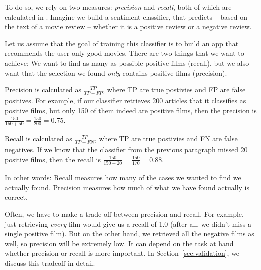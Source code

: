 
To do so, we rely on two measures: \emph{precision} and \emph{recall}, both of which are calculated in .
Imagine we build a sentiment classifier, that predicts -- based on the
text of a movie review -- whether it is a positive review or a
negative review.

Let us assume that the goal of training this classifier is to build an
app that recommends the user only good movies. There are two things
that we want to achieve: We want to find as many as possible positive
films (recall), but we also want that the selection we found
\emph{only} contains positive films (precision).

Precision is calculated as $\frac{TP}{TP+FP}$, where TP are true
postivies and FP are false positives. For example, if our classifier
retrieves 200 articles that it classifies as positive films, but only
150 of them indeed are positive films, then the precision is
$\frac{150}{150+50} = \frac{150}{200} = 0.75$.

Recall is calculated as $\frac{TP}{TP+FN}$, where TP are true
postivies and FN are false negatives. If we know that the classifier
from the previous paragraph missed 20 positive films, then the recall
is $\frac{150}{150+20} = \frac{150}{170}= 0.88$.

In other words: Recall measures how many of the cases we wanted to
find we actually found. Precision measures how much of what we have
found actually is correct.

Often, we have to make a trade-off between precision and recall. For
example, just retrieving \emph{every} film would give us a recall of
1.0 (after all, we didn't miss a single positive film). But on the
other hand, we retrieved all the negative films as well, so precision
will be extremely low. It can depend on the task at hand whether
precision or recall is more important. In
Section~\ref{sec:validation}, we discuss this tradeoff in detail.
